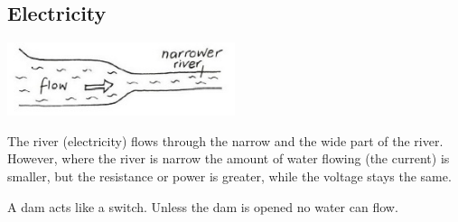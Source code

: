 \begin{multicols}{2}
\subsection*{Electricity}

\begin{center}
\includegraphics[width=0.5\textwidth]{./img/vso/analogy-elec.jpg}
\end{center}

The river (electricity) flows
through the narrow and the wide
part of the river. However, where
the river is narrow the amount of
water flowing (the current) is
smaller, but the resistance or
power is greater, while the
voltage stays the same.

A dam acts like a switch. Unless the dam is opened no water can flow.



\end{multicols}

\pagebreak